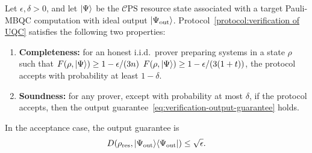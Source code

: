 \documentclass[a4paper,twocolumn,11pt,unpublished]{../../revision/quantumarticle}
\newcommand{\mCEPS}{\mathcal{C}\text{PS}}
\newcommand{\ketbra}[1]{\ket{#1}\!\bra{#1}}
\providecommand{\DIFadd}[1]{{\protect\color{blue} \sf #1}} %
\providecommand{\DIFdel}[1]{{\protect\color{red} \scriptsize #1}} %
\providecommand{\DIFaddbegin}{} %
\providecommand{\DIFaddend}{} %
\providecommand{\DIFdelbegin}{} %
\providecommand{\DIFdelend}{} %
\begin{document}
\begin{theorem}
    Let $\epsilon,\delta>0$, and let $\ket{\Psi}$ be the $\mCEPS$ resource state associated with a target Pauli-MBQC computation with ideal output $\ket{\Psi_{\rm out}}$. Protocol~\ref{protocol:verification of UQC} satisfies the following two properties:
    \begin{enumerate}
        \item \textbf{Completeness:} for an honest i.i.d.\ prover preparing systems in a state $\rho$ such that \DIFdelbegin \DIFdel{$F(\rho,\ket{\Psi})\geq 1-\epsilon/(3n)$}\DIFdelend \DIFaddbegin \DIFadd{$F(\rho,\ket{\Psi})\geq 1-\epsilon/(3(1+t))$}\DIFaddend , the protocol accepts with probability at least $1-\delta$.

        \item \textbf{Soundness:} for any prover, except with probability at most $\delta$, if the protocol accepts, then the output guarantee~\eqref{eq:verification-output-guarantee} holds.
    \end{enumerate}
    In the acceptance case, the output guarantee is
    \begin{equation}
        \label{eq:verification-output-guarantee}
        D(\rho_{\mathrm{res}},\ketbra{\Psi_{\rm out}})\leq \sqrt{\epsilon}.
    \end{equation}
\end{theorem}
\end{document}
